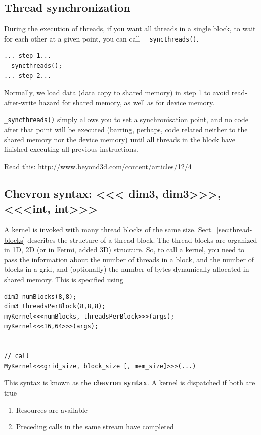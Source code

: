 \subsection{Thread synchronization}
\label{sec:thre-synchr}

During the execution of threads, if you want all threads in a single
block, to wait for each other at a given point, you can call
\verb!__syncthreads()!.

\begin{lstlisting}
... step 1...
__syncthreads();
... step 2...
\end{lstlisting}
Normally, we load data (data copy to shared memory) in step 1 to avoid
read-after-write hazard for shared memory, as well as for device memory.

\begin{framed}
  \verb!_syncthreads()! simply allows you to set a synchronisation
  point, and no code after that point will be executed (barring,
  perhaps, code related neither to the shared memory nor the device
  memory) until all threads in the block have finished executing all
  previous instructions.
\end{framed}

Read this: \url{http://www.beyond3d.com/content/articles/12/4}



\subsection{Chevron syntax: <<< dim3, dim3>>>, <<<int, int>>>}
\label{sec:chevron-syntax}
\label{sec:dim3}

A kernel is invoked with many thread blocks of the same
size. Sect.~\ref{sec:thread-blocks} describes the structure of a
thread block. The thread blocks are organized in 1D, 2D (or in Fermi,
added 3D) structure. So, to call a kernel, you need to pass the
information about the number of threads in a block, and the number of
blocks in a grid, and (optionally) the number of bytes dynamically
allocated in shared memory. This is specified using

\begin{lstlisting}
dim3 numBlocks(8,8);
dim3 threadsPerBlock(8,8,8);
myKernel<<<numBlocks, threadsPerBlock>>>(args);
myKernel<<<16,64>>>(args);


// call 
MyKernel<<<grid_size, block_size [, mem_size]>>>(...)
\end{lstlisting}
This syntax is known as the {\bf chevron syntax}.  A kernel is dispatched if
both are true
\begin{enumerate}
\item Resources are available
\item Preceding calls in the same stream have completed
\end{enumerate}

